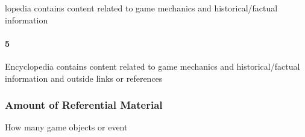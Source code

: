 lopedia contains content related to game mechanics and historical/factual information\paragraph{5}Encyclopedia contains content related to game mechanics and historical/factual information and outside links or references\subsubsection{Amount of Referential Material}How many game objects or event